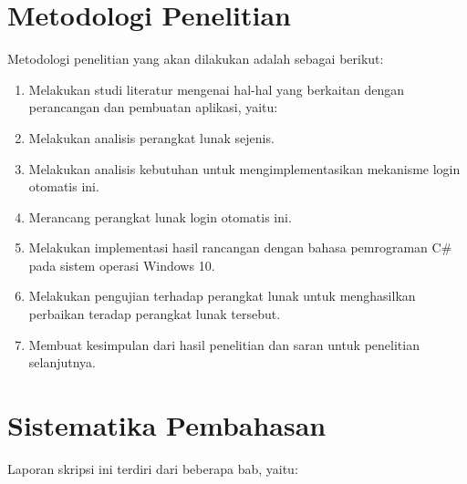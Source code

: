 \section{Metodologi Penelitian}
\label{sec:metodologi_penelitian}

Metodologi penelitian yang akan dilakukan adalah sebagai berikut:

\begin{enumerate}
    \item{Melakukan studi literatur mengenai hal-hal yang berkaitan dengan perancangan dan pembuatan aplikasi, yaitu:}
    \item{Melakukan analisis perangkat lunak sejenis.}
    \item{Melakukan analisis kebutuhan untuk mengimplementasikan mekanisme login otomatis ini.}
    \item{Merancang perangkat lunak login otomatis ini.}
    \item{Melakukan implementasi hasil rancangan dengan bahasa pemrograman C\# pada sistem operasi Windows 10.}
    \item{Melakukan pengujian terhadap perangkat lunak untuk menghasilkan perbaikan teradap perangkat lunak tersebut.}
    \item{Membuat kesimpulan dari hasil penelitian dan saran untuk penelitian selanjutnya.}
\end{enumerate}


\section{Sistematika Pembahasan}
\label{sec:sistematika_pembahasan}

Laporan skripsi ini terdiri dari beberapa bab, yaitu:

